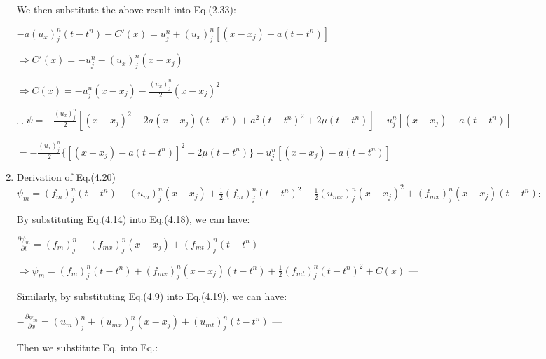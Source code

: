 \documentclass[a4paper,12pt]{article}
\begin{document}
\begin{enumerate}
        \hspace{4mm}We then substitute the above result into Eq.(2.33):

        \hspace{8mm}$-a(u_{x})^{n}_{j}(t-t^{n})-C'(x)=u^{n}_{j}+(u_{x})^{n}_{j}[(x-x_{j})-a(t-t^{n})]$

        \hspace{8mm}$\Rightarrow C'(x)=-u^{n}_{j}-(u_{x})^{n}_{j}(x-x_{j})$

        \hspace{8mm}$\Rightarrow C(x)=-u^{n}_{j}(x-x_{j})-\frac{(u_{x})^{n}_{j}}{2}(x-x_{j})^{2}$

        \hspace{4mm}${}_\cdot{}^\cdot{}_\cdot~\psi=-\frac{(u_{x})^{n}_{j}}{2}[(x-x_{j})^{2}-2a(x-x_{j})(t-t^{n})+a^{2}(t-t^{n})^{2}+2\mu(t-t^{n})]-u^{n}_{j}[(x-x_{j})-a(t-t^{n})]$

        \hspace{11mm}$=-\frac{(u_{x})^{n}_{j}}{2}\{[(x-x_{j})-a(t-t^{n})]^{2}+2\mu(t-t^{n})\}-u^{n}_{j}[(x-x_{j})-a(t-t^{n})]$

  \item Derivation of Eq.(4.20) $\psi_{m}=(f_{m})^{n}_{j}(t-t^{n})-(u_{m})^{n}_{j}(x-x_{j})+\frac{1}{2}(f_{m})^{n}_{j}(t-t^{n})^{2}-\frac{1}{2}(u_{mx})^{n}_{j}(x-x_{j})^{2}+(f_{mx})^{n}_{j}(x-x_{j})(t-t^{n})$:
        
        \hspace{4mm}By substituting Eq.(4.14) into Eq.(4.18), we can have:

        \hspace{8mm}$\frac{\partial\psi_{m}}{\partial t}=(f_{m})^{n}_{j}+(f_{mx})^{n}_{j}(x-x_{j})+(f_{mt})^{n}_{j}(t-t^{n})$

        \hspace{8mm}$\Rightarrow\psi_{m}=(f_{m})^{n}_{j}(t-t^{n})+(f_{mx})^{n}_{j}(x-x_{j})(t-t^{n})+\frac{1}{2}(f_{mt})^{n}_{j}(t-t^{n})^{2}+C(x)$ --- 

        \hspace{4mm}Similarly, by substituting Eq.(4.9) into Eq.(4.19), we can have:

        \hspace{8mm}$-\frac{\partial\psi_{m}}{\partial x}=(u_{m})^{n}_{j}+(u_{mx})^{n}_{j}(x-x_{j})+(u_{mt})^{n}_{j}(t-t^{n})$ --- 

        \hspace{4mm}Then we substitute Eq. into Eq.:


\end{enumerate}
\end{document}
